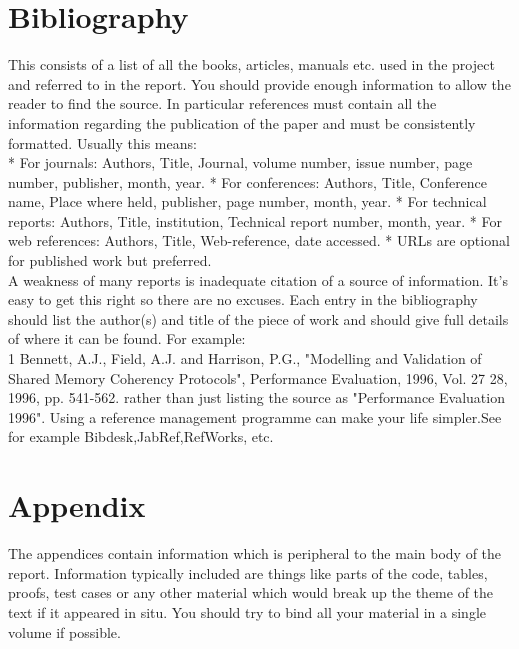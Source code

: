 \documentclass[12pt,twoside]{article}
\begin{document}
\newpage




\section{Bibliography}



This consists of a list of all the books, articles, manuals etc. used in the project and referred to in the report. You should provide enough information to allow the reader to find the source. In particular references must contain all the information regarding the publication of the paper and must be consistently formatted. Usually this means:\\
* For journals: Authors, Title, Journal, volume number, issue number, page number, publisher, month, year.
* For conferences: Authors, Title, Conference name, Place where held, publisher, page number, month, year.
* For technical reports: Authors, Title, institution, Technical report number, month, year.
* For web references: Authors, Title, Web-reference, date accessed.
* URLs are optional for published work but preferred.\\
A weakness of many reports is inadequate citation of a source of information. It's easy to get this right so there are no excuses. Each entry in the bibliography should list the author(s) and title of the piece of work and should give full details of where it can be found. For example:\\
1 Bennett, A.J., Field, A.J. and Harrison, P.G., "Modelling and Validation of Shared Memory Coherency Protocols", Performance Evaluation, 1996, Vol. 27  28, 1996, pp. 541-562. rather than just listing the source as "Performance Evaluation 1996".
Using a reference management programme can make your life simpler.See for example Bibdesk,JabRef,RefWorks, etc.\\


\newpage





\section{Appendix}


The appendices contain information which is peripheral to the main body of the report. Information typically included are things like parts of the code, tables, proofs, test cases or any other material which would break up the theme of the text if it appeared in situ. You should try to bind all your material in a single volume if possible.\\
\end{document}
